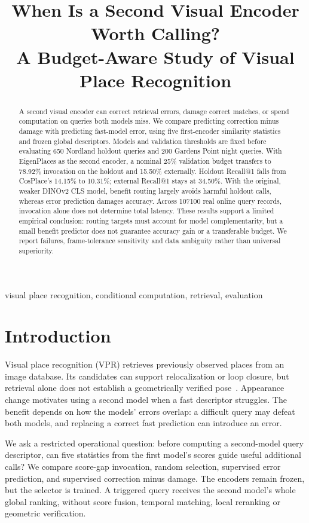 \documentclass[conference]{IEEEtran}
\title{When Is a Second Visual Encoder Worth Calling?\\
A Budget-Aware Study of Visual Place Recognition}
\author{\IEEEauthorblockN{Mingyang Zhou}
\IEEEauthorblockA{University of Chinese Academy of Sciences\\
\textit{Additional authors and correspondence pending}}}
\begin{document}
\maketitle
\begin{abstract}
A second visual encoder can correct retrieval errors, damage correct
matches, or spend computation on queries both models miss. We compare
predicting correction minus damage with predicting fast-model error,
using five first-encoder similarity statistics and frozen global
descriptors. Models and validation thresholds are fixed before evaluating
650 Nordland holdout queries and 200 Gardens Point night queries.
With EigenPlaces as the second encoder, a nominal 25\% validation budget
transfers to 78.92\% invocation on the holdout and 15.50\% externally.
Holdout Recall@1 falls from CosPlace's 14.15\% to 10.31\%; external
Recall@1 stays at 34.50\%. With the original, weaker DINOv2 CLS model,
benefit routing largely avoids harmful holdout calls, whereas error
prediction damages accuracy. Across 107100 real online query records,
invocation alone does not determine total latency. These results support
a limited empirical conclusion: routing targets must account for model
complementarity, but a small benefit predictor does not guarantee accuracy
gain or a transferable budget. We report failures, frame-tolerance
sensitivity and data ambiguity rather than universal superiority.
\end{abstract}
\begin{IEEEkeywords}
visual place recognition, conditional computation, retrieval, evaluation
\end{IEEEkeywords}

\section{Introduction}
Visual place recognition (VPR) retrieves previously observed places from
an image database. Its candidates can support relocalization or loop
closure, but retrieval alone does not establish a geometrically verified
pose~\cite{tutorial}. Appearance change motivates using a second model
when a fast descriptor struggles. The benefit depends on how the models'
errors overlap: a difficult query may defeat both models, and replacing a
correct fast prediction can introduce an error.

We ask a restricted operational question: before computing a second-model
query descriptor, can five statistics from the first model's scores guide
useful additional calls? We compare score-gap invocation, random selection,
supervised error prediction, and supervised correction minus damage.
The encoders remain frozen, but the selector is trained. A triggered query
receives the second model's whole global ranking, without score fusion,
temporal matching, local reranking or geometric verification.
\end{document}
